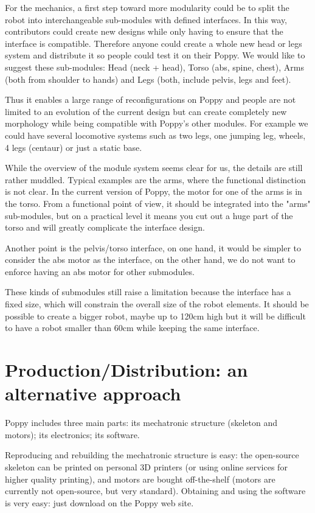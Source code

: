 For the mechanics, a first step toward more modularity could be to split the robot into interchangeable sub-modules with defined interfaces. In this way, contributors could create new designs while only having to ensure that the interface is compatible. Therefore anyone could create a whole new head or legs system and distribute it so people could test it on their Poppy.
We would like to suggest these sub-modules: Head (neck + head), Torso (abs, spine, chest), Arms (both from shoulder to hands) and Legs (both, include pelvis, legs and feet).

Thus it enables a large range of reconfigurations on Poppy and people are not limited to an evolution of the current design but can create completely new morphology while being compatible with Poppy's other modules.
For example we could have several locomotive systems such as two legs, one jumping leg, wheels, 4 legs (centaur) or just a static base.

While the overview of the module system seems clear for us, the details are still rather muddled. Typical examples are the arms, where the functional distinction is not clear. In the current version of Poppy, the motor for one of the arms is in the torso. From a functional point of view, it should be integrated into the "arms" sub-modules, but on a practical level it means you cut out a huge part of the torso and will greatly complicate the interface design.

Another point is the pelvis/torso interface, on one hand, it would be simpler to consider the abs motor as the interface, on the other hand, we do not want to enforce having an abs motor for other submodules.

These kinds of submodules still raise a limitation because the interface has a fixed size, which will constrain the overall size of the robot elements. It should be possible to create a bigger robot, maybe up to 120cm high but it will be difficult to have a robot smaller than 60cm while keeping the same interface.


\section{Production/Distribution: an alternative approach} %

Poppy includes three main parts: its mechatronic structure (skeleton and motors); its electronics; its software.

Reproducing and rebuilding the mechatronic structure is easy: the open-source skeleton can be printed on personal 3D printers (or using online services for higher quality printing), and motors are bought off-the-shelf (motors are currently not open-source, but very standard). Obtaining and using the software is very easy: just download on the Poppy web site.


